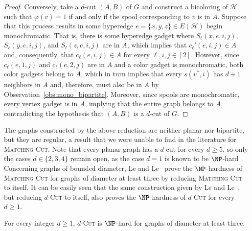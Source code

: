 \documentclass[a4paper,UKenglish,cleveref, autoref]{lipics-v2019}
\newcommand{\ig}[1]{\textcolor{red}{[Ig: #1]}}
\newcommand{\pname}[1]{\textsc{#1}}
\begin{document}
\begin{proof}
    Conversely, take a $d$-cut $(A, B)$ of $G$ and construct a bicoloring of $\mathcal{H}$ such that $\varphi(v) = 1$ if and only if the spool corresponding to $v$ is in $A$.
    Suppose that this process results in some hyperedge $e = \{x, y, z\} \in E(\mathcal{H})$ begin monochromatic.
    That is, there is some hyperedge gadget where $S_{\ell}(x, e, i, j)$, $S_{\ell}(y, e, i, j)$, and $S_{\ell}(z, e, i, j)$ are in $A$, which implies that $c_{\ell}'(e, i, j) \in A$ and, consequently, that $c_{\ell}(e, i, j) \in A$ for every $\ell,i,j \in [2]$.
    However, since $c_{\ell}(e, 1, j)$ and $c_{\ell}(e, 2, j)$ are in $A$ and a color gadget is monochromatic, both color gadgets belong to $A$, which in turn implies that every $s(v^*, i)$ has $d+1$ neighbors in $A$ and, therefore, must also be in $A$ by Observation~\ref{obs:mono_bipartite}.
    Moreover, since spools are monochromatic, every vertex gadget is in $A$, implying that the entire graph belongs to $A$, contradicting the hypothesis that $(A, B)$ is a $d$-cut of $G$.
\end{proof}


The graphs constructed by the above reduction are neither planar nor bipartite, but they are regular, a result that we were unable to find in the literature for \pname{Matching Cut}.
Note that every planar graph has a $d$-cut for every $d \geq 5$, so only the cases $d \in \{2,3,4\}$ remain open, as the case $d=1$ is known to be $\NP$-hard~\cite{matching_cut_planar}. %
Concerning graphs of bounded diameter, Le and Le~\cite{matching_cut_diameter} prove the $\NP$-hardness of \textsc{Matching Cut} for graphs of diameter at least three by reducing \textsc{Matching Cut} to itself.  It can be easily seen that the same construction given by Le and Le~\cite{matching_cut_diameter}, but reducing  \pname{$d$-Cut} to itself, also proves the $\NP$-hardness of \pname{$d$-Cut} for every $d \geq 1$. %


\begin{corollary}
    For every integer $d \geq 1$, \pname{$d$-Cut} is $\NP$-hard for graphs of diameter at least three.
\end{corollary}
\end{document}
